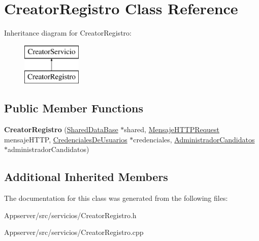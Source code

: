 \hypertarget{classCreatorRegistro}{}\section{Creator\+Registro Class Reference}
\label{classCreatorRegistro}
Inheritance diagram for Creator\+Registro\+:\begin{figure}[H]
\begin{center}
\leavevmode
\includegraphics[height=2.000000cm]{classCreatorRegistro}
\end{center}
\end{figure}
\subsection*{Public Member Functions}
\begin{DoxyCompactItemize}
\item 
{\bfseries Creator\+Registro} (\hyperlink{classSharedDataBase}{Shared\+Data\+Base} $\ast$shared, \hyperlink{classMensajeHTTPRequest}{Mensaje\+H\+T\+T\+P\+Request} mensaje\+H\+T\+TP, \hyperlink{classCredencialesDeUsuarios}{Credenciales\+De\+Usuarios} $\ast$credenciales, \hyperlink{classAdministradorCandidatos}{Administrador\+Candidatos} $\ast$administrador\+Candidatos)\hypertarget{classCreatorRegistro_a7c2d0dbdd63f69884c557f3d368e5484}{}\label{classCreatorRegistro_a7c2d0dbdd63f69884c557f3d368e5484}

\end{DoxyCompactItemize}
\subsection*{Additional Inherited Members}


The documentation for this class was generated from the following files\+:\begin{DoxyCompactItemize}
\item 
Appserver/src/servicios/Creator\+Registro.\+h\item 
Appserver/src/servicios/Creator\+Registro.\+cpp\end{DoxyCompactItemize}
